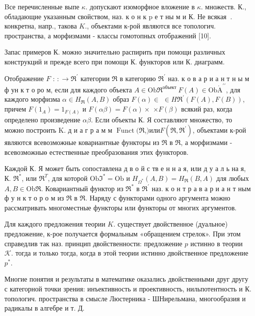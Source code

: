 \documentclass[10pt]{article}
\def\AA{\mathring{\mathrm{A}}}
\begin{document}
Bсе перечисленные выпе $\kappa$. допускают изоморфное вложение в $\kappa$. множеств. К., обладающие указанным свойством, наз. к о н к $\mathrm{p}$ е т ны м и $К$. Не всякая $\mathcal{~}$. конкретна, напр., такова $K$., объектами к-рой являются все топологич. пространства, а морфизмами - классы гомотопных отображений [10].



Запас примеров К. можно значительно распирить при помощи различных конструкций и прежде всего при помощи К. функторов или $К$. диаграмм.



Отображение $F$ : $: \rightarrow \mathfrak{\Re}^{\prime}$ категории $\mathscr{\Re}$ в категорию $\mathfrak{\Re}^{\prime}$ наз. к о в а р и а н т н ы м ф ун к т о ро м, если для каждого объекта $A \in \mathrm{Ob} \mathfrak{\Re}^{\text {объект }} F(A) \in \mathrm{Ob} \AA^{\prime \prime}$, для каждого морфизма $\alpha \in H_{\Re}(A, B)$ образ $F(\alpha) \in$ $\in H \Re^{\prime}(F(A), F(B))$, причем $F\left(1_{A}\right)=1_{F(A)}$ и $F(\alpha \beta)=F(\alpha) \times$ $\times F(\beta)$ всякий раз, когда определено произведение $\alpha \beta$. Если объекты К. Я составляют множество, то можно построить K. д и а г р а м м $\operatorname{Funct}(\mathfrak{\Re}$,$) или F\left(\Re, \mathfrak{\Re}^{\prime}\right)$, объектами к-рой являются всевозможные ковариантные функторы из $\Re$ в $\Re$, а морфизмами - всевозможныө естественные преобразования этих функторов.



Каждой К. Я может быть сопоставлена д в о й с тв е н н а я, или д у а л ь на я, К. $\mathfrak{R}^{*}$, или $\mathfrak{\Re}^{T}$, для которой $\mathrm{Ob} \mathfrak{I}^{*}=\mathrm{Ob}$ и $H_{\mathfrak{\Omega}^{*}}(A, B)=H_{\Re}(B, A)$ для любых $A, B \in \mathrm{Ob \Re}$. Ковариантный функтор из $\mathfrak{\Re}^{*}$ в $\mathfrak{R}^{\prime}$ наз. к о н т р а в а р и а н т ным ф у н к т о р о м из $\Re$ в $\Re$. Наряду с функторами одного аргумента можно рассматривать многоместные функторы или функторы от многих аргументов.



Для каждого предложения теории $K$. существует двойственное (дуальное) предложение, к-рое получается формальным «обращением стрелок». При этом справедлив так наз. принцип двойственности: предложение $p$ истинно в теории $\mathcal{K}$. тогда и только тогда, когда в этой теории истинно двойственное предложение $p^{*}$.



Многие понятия и результаты в математике оказались двойственными друг другу с категорной точки зрения: инъективность и проективность, нильпотентность и К. топологич. пространства в смысле Люстерника - ШНирельмана, многообразия и радикалы в алгебре и т. Д.
\end{document}
